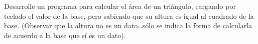Desarrolle un programa para calcular el área de un triángulo, cargando por teclado el valor de la base, pero sabiendo que su altura es igual al cuadrado de la base. (Observar que la altura no es un dato\ldots sólo se indica la forma de calcularla de acuerdo a la base que sí es un dato).